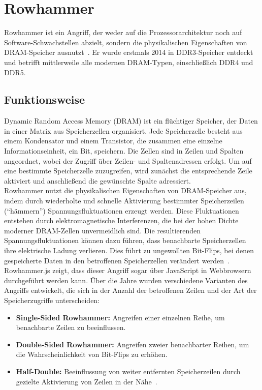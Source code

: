 \section{Rowhammer}
\label{sec:rowhammer}
Rowhammer ist ein Angriff, der weder auf die Prozessorarchitektur noch auf Software-Schwachstellen abzielt, sondern die physikalischen Eigenschaften von DRAM-Speicher ausnutzt~\cite{mutlu2019rowhammer}.
Er wurde erstmals 2014 in DDR3-Speicher entdeckt~\cite{kim2014flipping} und betrifft mittlerweile alle modernen DRAM-Typen, einschließlich DDR4 und DDR5.

\subsection{Funktionsweise}
\label{subsec:rowhammer_funktionsweise}
Dynamic Random Access Memory (DRAM) ist ein flüchtiger Speicher, der Daten in einer Matrix aus Speicherzellen organisiert.
Jede Speicherzelle besteht aus einem Kondensator und einem Transistor, die zusammen eine einzelne Informationseinheit, ein Bit, speichern.
Die Zellen sind in Zeilen und Spalten angeordnet, wobei der Zugriff über Zeilen- und Spaltenadressen erfolgt.
Um auf eine bestimmte Speicherzelle zuzugreifen, wird zunächst die entsprechende Zeile aktiviert und anschließend die gewünschte Spalte adressiert. \\
Rowhammer nutzt die physikalischen Eigenschaften von DRAM-Speicher aus, indem durch wiederholte und schnelle Aktivierung bestimmter Speicherzeilen (\enquote{hämmern}) Spannungsfluktuationen erzeugt werden.
Diese Fluktuationen entstehen durch elektromagnetische Interferenzen, die bei der hohen Dichte moderner DRAM-Zellen unvermeidlich sind.
Die resultierenden Spannungsfluktuationen können dazu führen, dass benachbarte Speicherzellen ihre elektrische Ladung verlieren.
Dies führt zu ungewollten Bit-Flips, bei denen gespeicherte Daten in den betroffenen Speicherzellen verändert werden~\cite{mutlu2019rowhammer}. \\
Rowhammer.js zeigt, dass dieser Angriff sogar über JavaScript in Webbrowsern durchgeführt werden kann.
Über die Jahre wurden verschiedene Varianten des Angriffs entwickelt, die sich in der Anzahl der betroffenen Zeilen und der Art der Speicherzugriffe unterscheiden:
\begin{itemize}
	\itemsep0em
	\item \textbf{Single-Sided Rowhammer:} Angreifen einer einzelnen Reihe, um benachbarte Zeilen zu beeinflussen.
	\item \textbf{Double-Sided Rowhammer:} Angreifen zweier benachbarter Reihen, um die Wahrscheinlichkeit von Bit-Flips zu erhöhen.
	\item \textbf{Half-Double:} Beeinflussung von weiter entfernten Speicherzeilen durch gezielte Aktivierung von Zeilen in der Nähe~\cite{qazi2021half_double}.
\end{itemize}

